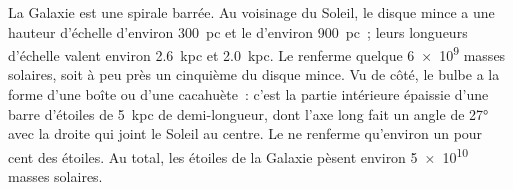 La Galaxie est une spirale barrée. Au voisinage du Soleil, le disque mince a une
hauteur d'échelle d'environ \qty{300}{pc} et le  d'environ
\qty{900}{pc}~; leurs longueurs d'échelle valent environ \qty{2.6}{kpc} et
\qty{2.0}{kpc}. Le  renferme quelque \num{6e9} masses solaires,
soit à peu près un cinquième du disque mince. Vu de côté, le bulbe a la forme
d'une boîte ou d'une cacahuète~: c'est la partie intérieure épaissie d'une barre
d'étoiles de \qty{5}{kpc} de demi-longueur, dont l'axe long fait un angle de
\ang{27} avec la droite qui joint le Soleil au centre. Le  ne renferme
qu'environ un pour cent des étoiles. Au total, les étoiles de la Galaxie
pèsent environ \num{5e10} masses solaires.

